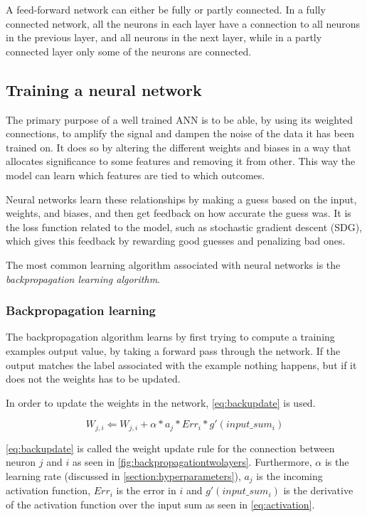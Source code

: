 A feed-forward network can either be fully or partly connected. In a fully connected network, all the neurons in each layer have a connection to all neurons in the previous layer, and all neurons in the next layer, while in a partly connected layer only some of the neurons are connected.

\subsection{Training a neural network}
The primary purpose of a well trained ANN is to be able, by using its weighted connections, to amplify the signal and dampen the noise of the data it has been trained on. It does so by altering the different weights and biases in a way that allocates significance to some features and removing it from other. This way the model can learn which features are tied to which outcomes.

Neural networks learn these relationships by making a guess based on the input, weights, and biases, and then get feedback on how accurate the guess was. It is the loss function related to the model, such as stochastic gradient descent (SDG), which gives this feedback by rewarding good guesses and penalizing bad ones.

The most common learning algorithm associated with neural networks is the \textit{backpropagation learning algorithm}.

\subsubsection{Backpropagation learning}
The backpropagation algorithm learns by first trying to compute a training examples output value, by taking a forward pass through the network. If the output matches the label associated with the example nothing happens, but if it does not the weights has to be updated.

In order to update the weights in the network, \autoref{eq:backupdate} is used.

\begin{equation}\label{eq:backupdate}
	W_{j,i} \Leftarrow W_{j,i}+ \alpha*a_{j}*Err_{i}*g'(input\_sum_{i})
\end{equation}

\autoref{eq:backupdate} is called the weight update rule for the connection between neuron $j$ and $i$ as seen in \autoref{fig:backpropagationtwolayers}. Furthermore, $\alpha$ is the learning rate (discussed in \autoref{section:hyperparameters}), $a_{j}$ is the incoming activation function, $Err_{i}$ is the error in $i$ and $g'(input\_sum_{i})$ is the derivative of the activation function over the input sum as seen in \autoref{eq:activation}.


